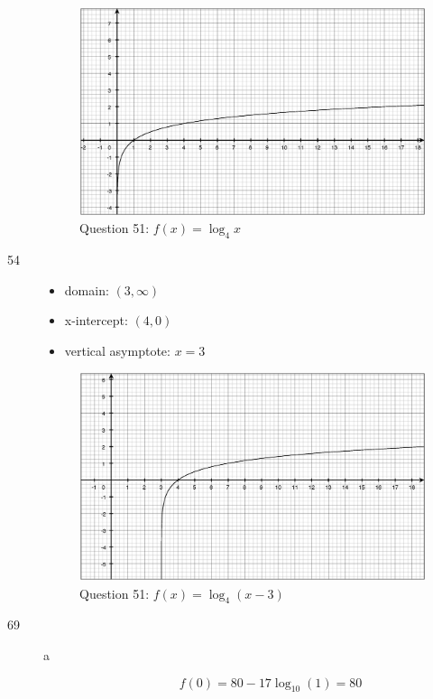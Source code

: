 \documentclass[fleqn,addpoints]{exam}
\begin{document}
\begin{description}
\begin{figure}[H]
  \centering
  \includegraphics[scale=.3]{question51.eps}
  \caption*{Question 51: $f(x) = \log_4 x$}
\end{figure}

\item[54]

\begin{itemize}
\item domain: $(3, \infty) $
\item x-intercept: $(4, 0) $
\item vertical asymptote: $x = 3$
\end{itemize}

\begin{figure}[H]
  \centering
  \includegraphics[scale=.3]{question54.eps}
  \caption*{Question 51: $f(x) = \log_4(x - 3)$}
\end{figure}

\item[69]

\begin{description}
\item[a] 
\[
  f(0) = 80 - 17 \log_{10}(1) = 80 
\]


\end{description}
\end{description}
\end{document}
